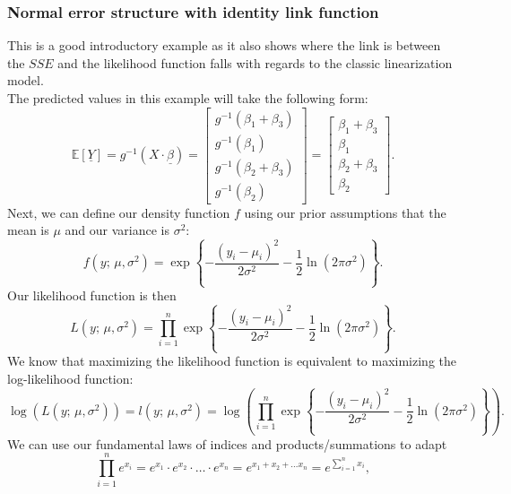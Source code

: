 \documentclass{article}
\begin{document}
\subsubsection{Normal error structure with identity link function} \label{sec:ex_norm}
This is a good introductory example as it also shows where the link is between the $SSE$ and the likelihood function falls with regards to the classic linearization model. \\
The predicted values in this example will take the following form:
\begin{equation}
    \mathbb{E}[\underline{Y}] = g^{-1}(X\cdot \underline{\beta}) = \begin{bmatrix} g^{-1}(\beta_1 + \beta_3) \\ g^{-1}(\beta_1) \\ g^{-1}(\beta_2 + \beta_3) \\ g^{-1}(\beta_2) \end{bmatrix} = \begin{bmatrix} \beta_1 + \beta_3 \\ \beta_1 \\ \beta_2 + \beta_3 \\ \beta_2 \end{bmatrix}.
\end{equation}
Next, we can define our density function $f$ using our prior assumptions that the mean is $\mu$ and our variance is $\sigma^2$:
\begin{equation}
    f(y;\,\mu,\sigma^2) = \exp{\left\{ -\frac{(y_i-\mu_i)^2}{2\sigma^2}-\frac{1}{2}\ln{(2\pi\sigma^2)} \right\}}.
\end{equation}
Our likelihood function is then
\begin{equation}
    L(y;\,\mu,\sigma^2) = \prod_{i=1}^n\exp{\left\{ -\frac{(y_i-\mu_i)^2}{2\sigma^2}-\frac{1}{2}\ln{(2\pi\sigma^2)} \right\}}.
\end{equation}
We know that maximizing the likelihood function is equivalent to maximizing the log-likelihood function:
\begin{equation}
    \log(L(y;\,\mu,\sigma^2)) = l(y;\,\mu,\sigma^2) = \log\left(\prod_{i=1}^n\exp{\left\{ -\frac{(y_i-\mu_i)^2}{2\sigma^2}-\frac{1}{2}\ln{(2\pi\sigma^2)} \right\}}\right).\label{eq:log_like}
\end{equation}
We can use our fundamental laws of indices and products/summations to adapt 
\begin{equation}
    \prod_{i=1}^n e^{x_i} = e^{x_1}\cdot e^{x_2}\cdot\ldots\cdot e^{x_n} = e^{x_1+x_2+\ldots x_n} = e^{\sum_{i=1}^n x_i},
\end{equation}
\end{document}

